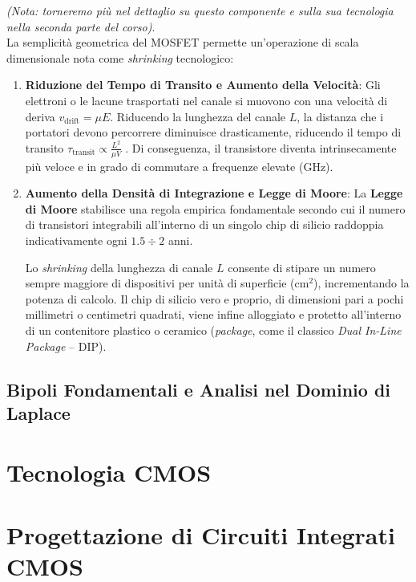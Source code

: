\documentclass[12pt, a4paper]{report}
\begin{document}
\textit{(Nota: torneremo più nel dettaglio su questo componente e sulla sua tecnologia nella seconda parte del corso)}.\\

La semplicità geometrica del MOSFET permette un'operazione di scala dimensionale nota come \textit{shrinking} tecnologico:
\begin{enumerate}
    \item \textbf{Riduzione del Tempo di Transito e Aumento della Velocità}:
    Gli elettroni o le lacune trasportati nel canale si muovono con una velocità di deriva $v_{\text{drift}} = \mu E$. Riducendo la lunghezza del canale $L$, la distanza che i portatori devono percorrere diminuisce drasticamente, riducendo il tempo di transito $\tau_{\text{transit}} \propto \frac{L^2}{\mu V}$ . Di conseguenza, il transistore diventa intrinsecamente più veloce e in grado di commutare a frequenze elevate ($\mathrm{GHz}$).

    \item \textbf{Aumento della Densità di Integrazione e Legge di Moore}:
    La \textbf{Legge di Moore} stabilisce una regola empirica fondamentale secondo cui il numero di transistori integrabili all'interno di un singolo chip di silicio raddoppia indicativamente ogni $1.5 \div 2$ anni. 
    
    Lo \textit{shrinking} della lunghezza di canale $L$ consente di stipare un numero sempre maggiore di dispositivi per unità di superficie ($\mathrm{cm}^2$), incrementando la potenza di calcolo. Il chip di silicio vero e proprio, di dimensioni pari a pochi millimetri o centimetri quadrati, viene infine alloggiato e protetto all'interno di un contenitore plastico o ceramico (\textit{package}, come il classico \textit{Dual In-Line Package} -- DIP).
\end{enumerate}
    
  
\chapter{Bipoli Fondamentali e Analisi nel Dominio di Laplace}


\part{Tecnologia CMOS}




\part{Progettazione di Circuiti Integrati CMOS}
\end{document}
